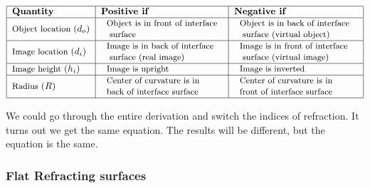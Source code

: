 \documentclass{article}
\begin{document}
\[
\begin{tabular}{|l|l|l|}
\hline
\textbf{Quantity} & \textbf{Positive if} & \textbf{Negative if} \\ \hline
{\small Object location }$\left( d_{o}\right) $ & 
\begin{tabular}{l}
{\small Object is in front of interface} \\ 
{\small \ surface}%
\end{tabular}
& 
\begin{tabular}{l}
{\small Object is in back of interface} \\ 
{\small \ surface (virtual object)}%
\end{tabular}%
{\small \ } \\ \hline
{\small Image location }$\left( d_{i}\right) $ & 
\begin{tabular}{l}
{\small Image is in back of interface} \\ 
{\small \ surface (real image)}%
\end{tabular}
& 
\begin{tabular}{l}
{\small Image is in front of interface} \\ 
{\small \ surface (virtual image)}%
\end{tabular}
\\ \hline
{\small Image height }$\left( h_{i}\right) $ & 
\begin{tabular}{l}
{\small Image is upright}%
\end{tabular}
& 
\begin{tabular}{l}
{\small Image is inverted}%
\end{tabular}
\\ \hline
{\small Radius }$\left( R\right) $ & 
\begin{tabular}{l}
{\small Center of curvature is in} \\ 
{\small back of interface surface}%
\end{tabular}%
{\small \ } & 
\begin{tabular}{l}
{\small Center of curvature is in} \\ 
{\small front of interface surface}%
\end{tabular}%
{\small \ } \\ \hline
\end{tabular}%
\]

We could go through the entire derivation and switch the indices of
refraction. It turns out we get the same equation. The results will be
different, but the equation is the same.

\subsubsection{Flat Refracting surfaces}
\end{document}
